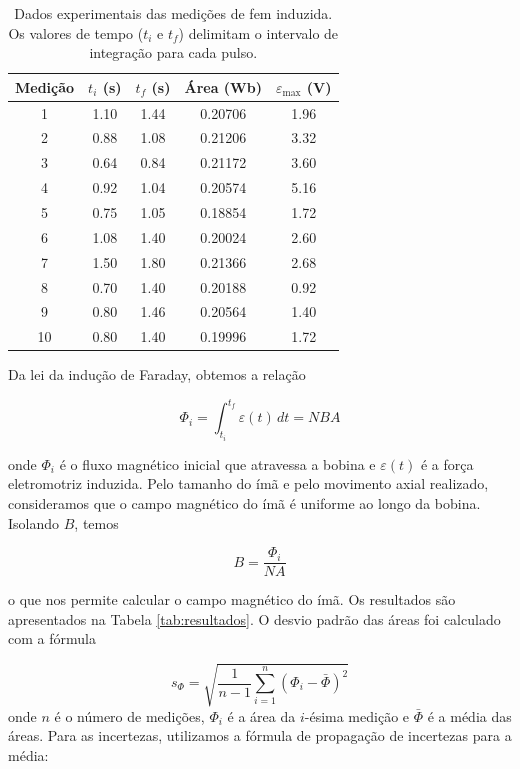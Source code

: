 \documentclass[12pt, a4paper]{article}
\begin{document}
\begin{table}[H]
\centering
\begin{tabular}{ccccc}
\toprule
\textbf{Medição} & \textbf{$t_i$ (s)} & \textbf{$t_f$ (s)} & \textbf{Área (Wb)} & \textbf{$\mathcal{\varepsilon}_{\text{max}}$ (V)} \\
\midrule
1 & 1.10 & 1.44 & 0.20706 & 1.96 \\
2 & 0.88 & 1.08 & 0.21206 & 3.32 \\
3 & 0.64 & 0.84 & 0.21172 & 3.60 \\
4 & 0.92 & 1.04 & 0.20574 & 5.16 \\
5 & 0.75 & 1.05 & 0.18854 & 1.72 \\
6 & 1.08 & 1.40 & 0.20024 & 2.60 \\
7 & 1.50 & 1.80 & 0.21366 & 2.68 \\
8 & 0.70 & 1.40 & 0.20188 & 0.92 \\
9 & 0.80 & 1.46 & 0.20564 & 1.40 \\
10 & 0.80 & 1.40 & 0.19996 & 1.72 \\
\bottomrule
\end{tabular}
\caption{Dados experimentais das medições de fem induzida. Os valores de tempo ($t_i$ e $t_f$) delimitam o intervalo de integração para cada pulso.}
\label{tab:medicoes}
\end{table}

Da lei da indução de Faraday, obtemos a relação

\begin{equation}\label{eq:lei_faraday}
    \Phi_i = \int_{t_i}^{t_f} \mathcal{\varepsilon}(t) \, dt = NBA
\end{equation}

\noindent onde $\Phi_i$ é o fluxo magnético inicial que atravessa a bobina e $\mathcal{\varepsilon}(t)$ é a força eletromotriz induzida. Pelo tamanho do ímã e pelo movimento axial realizado, consideramos que o campo magnético do ímã é uniforme ao longo da bobina. Isolando $B$, temos

\begin{equation}
    B = \frac{\Phi_i}{NA}
\end{equation}

\noindent o que nos permite calcular o campo magnético do ímã. Os resultados são apresentados na Tabela \ref{tab:resultados}. O desvio padrão das áreas foi calculado com a fórmula

\begin{equation}
    s_{\Phi} = \sqrt{\frac{1}{n-1} \sum_{i=1}^{n} (\Phi_i - \bar{\Phi})^2}
\end{equation}
\noindent onde $n$ é o número de medições, $\Phi_i$ é a área da $i$-ésima medição e $\bar{\Phi}$ é a média das áreas. Para as incertezas, utilizamos a fórmula de propagação de incertezas para a média:
\end{document}
